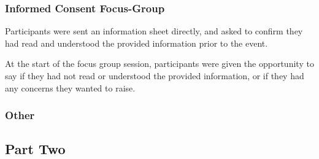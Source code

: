 \documentclass[manuscript,screen,review]{acmart}
\begin{document}
 
\subsubsection{Informed Consent Focus-Group}  


Participants were sent an information sheet directly, and asked to confirm they had read and understood the provided information prior to the event.

At the start of the focus group session, participants were given the opportunity to say if they had not read or understood the provided information, or if they had any concerns they wanted to raise. 

\subsubsection{Other}  







\subsection{Part Two}  
\end{document}

